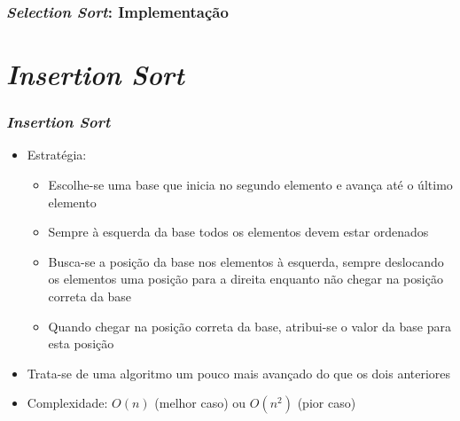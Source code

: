 \documentclass[aspectratio=169]{beamer}
\begin{document}
\begin{frame}\frametitle{\emph{Selection Sort}: Implementação}

\end{frame}

\section{\emph{Insertion Sort}}

\begin{frame}\frametitle{\emph{Insertion Sort}}
\begin{itemize}
	\item Estratégia:
	\begin{itemize}
		\item Escolhe-se uma base que inicia no segundo elemento e avança até o último elemento
		\item Sempre à esquerda da base todos os elementos devem estar ordenados
		\item Busca-se a posição da base nos elementos à esquerda, sempre deslocando os elementos uma posição para a direita enquanto não chegar na posição correta da base
		\item Quando chegar na posição correta da base, atribui-se o valor da base para esta posição
	\end{itemize}
	\item Trata-se de uma algoritmo um pouco mais avançado do que os dois anteriores
	\item Complexidade: $O(n)$ (melhor caso) ou $O(n^2)$ (pior caso)
\end{itemize}
\end{frame}	
\end{document}
